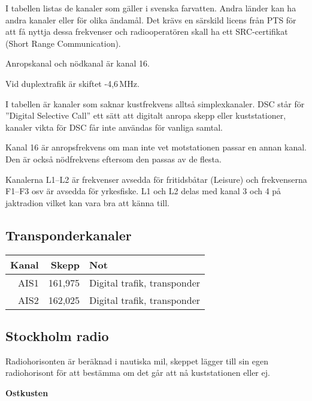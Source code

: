 I tabellen listas de kanaler som gäller i svenska farvatten. Andra
länder kan ha andra kanaler eller för olika ändamål. Det krävs en
särskild licens från PTS för att få nyttja dessa frekvenser och
radiooperatören skall ha ett SRC-certifikat (Short Range
Communication).

Anropskanal och nödkanal är kanal 16.

Vid duplextrafik är skiftet -4,6\,MHz.

I tabellen är kanaler som saknar kustfrekvens alltså
simplexkanaler. DSC står för ''Digital Selective Call'' ett sätt att
digitalt anropa skepp eller kuststationer, kanaler vikta för DSC får
inte användas för vanliga samtal.

Kanal 16 är anropsfrekvens om man inte vet motstationen passar en
annan kanal. Den är också nödfrekvens eftersom den passas av de
flesta.

Kanalerna L1--L2 är frekvenser avsedda för fritidsbåtar (Leisure) och
frekvenserna F1--F3 osv är avsedda för yrkesfiske. L1 och L2 delas med
kanal 3 och 4 på jaktradion vilket kan vara bra att känna till.

\subsection{Transponderkanaler}
\begin{longtable}{rrl}
	\textbf{Kanal} & \textbf{Skepp} & \textbf{Not} \\ \hline
	   \endhead
AIS1 & 161,975 & Digital trafik, transponder\\
AIS2 & 162,025 & Digital trafik, transponder\\
\end{longtable}

\subsection{Stockholm radio}

Radiohorisonten är beräknad i nautiska mil, skeppet lägger till sin egen
radiohorisont för att bestämma om det går att nå kuststationen eller ej.

\textbf{Ostkusten}


